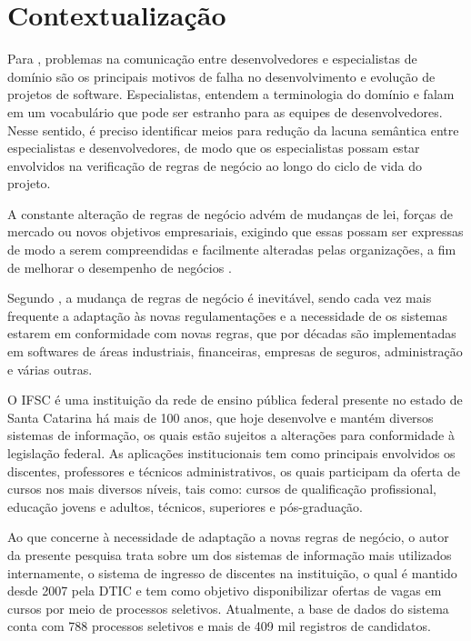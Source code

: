 \section{Contextualização}
\label{contextualizacao}

 Para , problemas na comunicação entre desenvolvedores e especialistas de domínio são os principais motivos de falha no desenvolvimento e evolução de projetos de software. Especialistas, entendem a terminologia do domínio e falam em um vocabulário que pode ser estranho para as equipes de desenvolvedores. Nesse sentido, é preciso identificar meios para redução da lacuna semântica entre especialistas e desenvolvedores, de modo que os especialistas possam estar envolvidos na verificação de regras de negócio ao longo do ciclo de vida do projeto.

 A constante alteração de regras de negócio advém de mudanças de lei, forças de mercado ou novos objetivos empresariais, exigindo que essas possam ser expressas de modo a serem compreendidas e facilmente alteradas pelas organizações, a fim de melhorar o desempenho de negócios \cite{flexiblerules}.
 
 Segundo , a mudança de regras de negócio é inevitável, sendo cada vez mais frequente a adaptação às novas regulamentações e a necessidade de os sistemas estarem em conformidade com novas regras, que por décadas são implementadas em softwares de áreas industriais, financeiras, empresas de seguros, administração e várias outras.
 
 O \gls{IFSC} é uma instituição da rede de ensino pública federal presente no estado de Santa Catarina há mais de 100 anos, que hoje desenvolve e mantém diversos sistemas de informação, os quais estão sujeitos a alterações para conformidade à legislação federal. As aplicações institucionais tem como principais envolvidos os discentes, professores e técnicos administrativos, os quais participam da oferta de cursos nos mais diversos níveis, tais como: cursos de qualificação profissional, educação jovens e adultos, técnicos, superiores e pós-graduação. 
 
 Ao que concerne à necessidade de adaptação a novas regras de negócio, o autor da presente pesquisa trata sobre um dos sistemas de informação mais utilizados internamente, o sistema de ingresso de discentes na instituição, o qual é mantido desde 2007 pela \gls{DTIC} e tem como objetivo disponibilizar ofertas de vagas em cursos por meio de processos seletivos. Atualmente, a base de dados do sistema conta com 788 processos seletivos e mais de 409 mil registros de candidatos.
 
